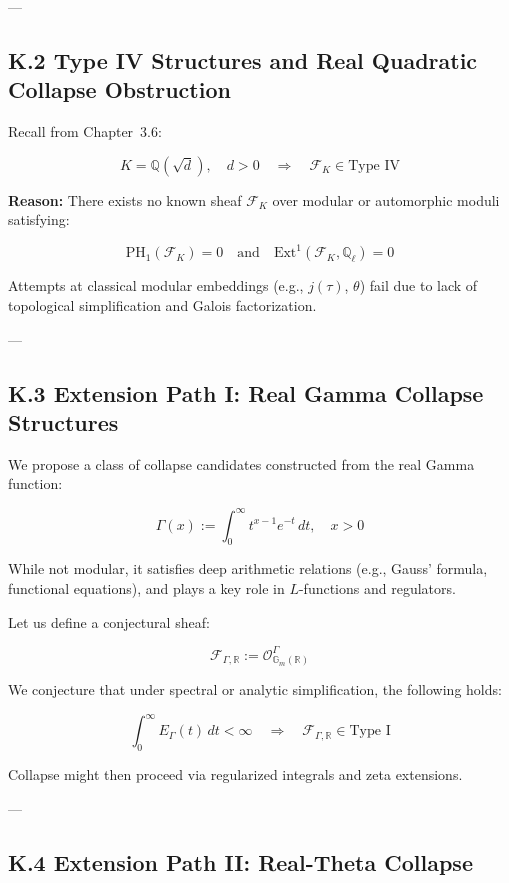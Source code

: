 \documentclass[11pt]{article}
\begin{document}
---

\subsection*{K.2 Type IV Structures and Real Quadratic Collapse Obstruction}

Recall from Chapter~3.6:

\[
K = \mathbb{Q}(\sqrt{d}),\quad d > 0 \quad \Rightarrow \quad \mathcal{F}_K \in \text{Type IV}
\]

\textbf{Reason:} There exists no known sheaf \( \mathcal{F}_K \) over modular or automorphic moduli satisfying:

\[
\mathrm{PH}_1(\mathcal{F}_K) = 0 \quad \text{and} \quad \mathrm{Ext}^1(\mathcal{F}_K, \mathbb{Q}_\ell) = 0
\]

Attempts at classical modular embeddings (e.g., \( j(\tau) \), \( \theta \)) fail due to lack of topological simplification and Galois factorization.

---

\subsection*{K.3 Extension Path I: Real Gamma Collapse Structures}

We propose a class of collapse candidates constructed from the real Gamma function:

\[
\Gamma(x) := \int_0^\infty t^{x-1} e^{-t}\,dt, \quad x > 0
\]

While not modular, it satisfies deep arithmetic relations (e.g., Gauss’ formula, functional equations), and plays a key role in \( L \)-functions and regulators.

Let us define a conjectural sheaf:

\[
\mathcal{F}_{\Gamma,\mathbb{R}} := \mathcal{O}^{\Gamma}_{\mathbb{G}_m(\mathbb{R})}
\]

We conjecture that under spectral or analytic simplification, the following holds:

\[
\int_0^\infty E_{\Gamma}(t)\,dt < \infty \quad \Rightarrow \quad \mathcal{F}_{\Gamma,\mathbb{R}} \in \text{Type I}
\]

Collapse might then proceed via regularized integrals and zeta extensions.

---

\subsection*{K.4 Extension Path II: Real-Theta Collapse}
\end{document}
